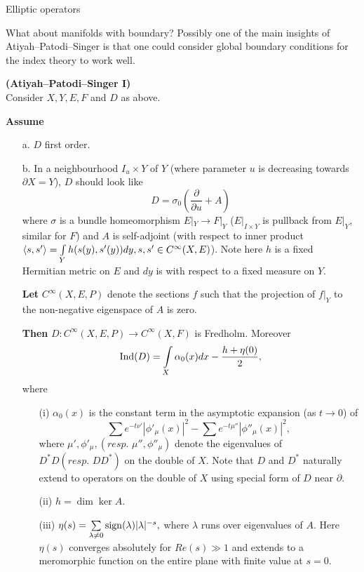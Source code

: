 \begin{clear}{Elliptic operators}
\begin{clear}{What about manifolds with boundary?}
Possibly one of the main insights of Atiyah--Patodi--Singer is that one could consider global boundary conditions for the index theory to work well.

\begin{thm}{\bf(Atiyah--Patodi--Singer I)}\\
Consider $X, Y, E, F$ and $D$ as above.

{\bf Assume}
\begin{enumerate}
\item[a.] $D$ first order.
\item[b.] In a neighbourhood $I_u \times Y$ of $Y$ (where parameter $u$ is decreasing towards $\partial X = Y$), $D$ should look like
$$D = \sigma_0 (\frac{\partial}{\partial u } + A)$$ where $\sigma$ is a bundle homeomorphism $E|_Y \to F|_Y$ ($E|_{I \times Y}$ is pullback from $E|_Y$, similar for $F$) and $A$ is self-adjoint (with respect to inner product $\langle s, s' \rangle = \int\limits_Y h(s(y), s'(y)) dy, s, s' \in C^\infty (X,E)$). Note here $h$ is a fixed Hermitian metric on $E$ and $dy$ is with respect to a fixed measure on $Y$.

{\bf Let} $C^\infty (X,E,P)$ denote the sections $f$ such that the projection of $f|_Y$ to the non-negative eigenspace of $A$ is zero.

{\bf Then} $D: C^\infty(X,E,P) \to C^\infty(X,F)$ is Fredholm.
Moreover
$$\mathrm{Ind} (D) = \int\limits_X \alpha_0(x) dx - \frac{h + \eta(0)}{2} ,$$
where
\begin{enumerate}
\item[(i)] $\alpha_0 (x)$ is the constant term in the asymptotic expansion (as $t \to 0$) of $$\sum e^{-t\nu'} |\phi'_\mu(x)|^2 - \sum e^{-t\mu''} |\phi''_\mu(x)|^2,$$
where $\mu', \phi'_\mu, (resp. \,\, \mu'', \phi''_\mu)$ denote the eigenvalues of $D^\ast D (resp. \,\, DD^\ast)$ on the double of $X$. Note that $D$ and $D^\ast$ naturally extend to operators on the double of $X$ using special form of $D$ near $\partial$.
\item[(ii)] $h = \dim \ker A$.
\item[(iii)] $\eta(s) = \sum\limits_{\lambda \neq 0} {\rm sign} (\lambda) |\lambda|^{-s},$ where $\lambda$ runs over eigenvalues of $A$. Here $\eta(s)$ converges absolutely for $Re(s) \gg 1$ and extends to a meromorphic function on the entire plane with finite value at $s=0$.
\end{enumerate}
\end{enumerate}
\end{thm}
\end{clear}


\end{clear}
